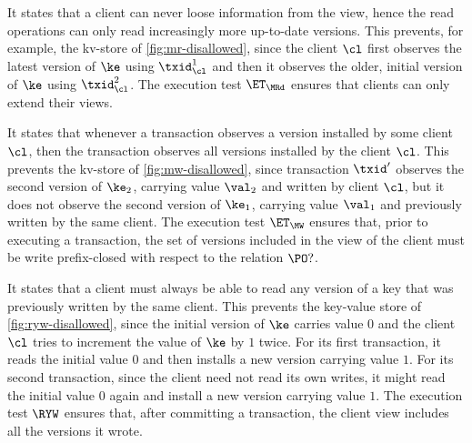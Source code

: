 

It states that a client  can never loose information from the
view, hence the read operations can only read increasingly
more up-to-date versions. This prevents, for example,  the kv-store of \cref{fig:mr-disallowed},
since the client $\cl$ first observes the
latest version of $\ke$ using $\txid_{\cl}^{1}$ and then it observes
the older, initial version of $\ke$ using $\txid_{\cl}^{2}$.  The
execution test $\ET_{\MRd}$ ensures that clients  can only extend
their views. 

It states that whenever a transaction observes a version installed by some client $\cl$,
then the transaction observes all versions installed by the client $\cl$. This prevents the kv-store of 
\cref{fig:mw-disallowed}, since 
transaction $\txid'$ observes the second version of $\ke_2$, carrying
value $\val_2$ and written by client $\cl$, 
but it does not observe the second version of $\ke_1$, carrying value
$\val_1$ and previously written by the same client.
The execution test $\ET_{\MW}$  ensures that, prior to executing a transaction,
the set of versions included in the view of the client must be write 
prefix-closed with respect to the relation $\PO ?$.



It states that a client must always be able to read any version of a
key that was previously written by the same client.
This prevents the key-value store of \cref{fig:ryw-disallowed},
since the initial version of $\ke$ carries value $0$
and the client $\cl$ tries to increment the value of $\ke$ by $1$
twice.  For its first transaction, it reads the initial value $0$ and then
installs  a new version carrying  value $1$. For its second
transaction, since the client  need not  read its own writes, 
it might read the initial value $0$ again
and install a new version carrying value $1$.
The execution test $\RYW$ ensures  that, after committing a transaction, 
the  client view includes all the versions it wrote.  

